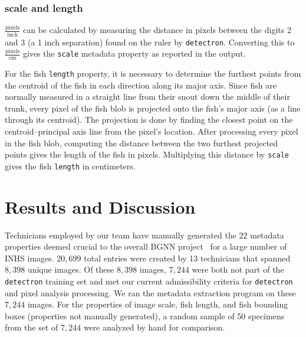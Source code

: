 \documentclass[conference]{IEEEtran}
\begin{document}
\subsubsection{scale and length}
\(\frac{\mathrm{pixels}}{\mathrm{inch}}\) can be calculated by measuring the distance in pixels between the digits 2 and 3 (a 1 inch separation) found on the ruler by \verb|detectron|. Converting this to \(\frac{\mathrm{pixels}}{\mathrm{cm}}\) gives the \verb|scale| metadata property as reported in the output.

For the fish \verb|length| property, it is necessary to determine the furthest points from the centroid of the fish in each direction along its major
axis. Since fish are normally measured in a straight line from their snout down the middle of their trunk, every pixel of the fish blob is projected
onto the fish's major axis (as a line through its centroid).
The projection is done by finding the closest point on the
centroid--principal axis line from the pixel's location.
After processing every pixel in the fish blob, computing the distance
between the two furthest projected points gives the length of the fish in pixels. Multiplying this distance by \verb|scale| gives the fish \verb|length| in centimeters.

\section{Results and Discussion}
Technicians employed by our team have manually generated the 22 metadata properties deemed crucial to the overall BGNN project~\cite{leipzig2021biodiversity} for a large number of INHS images. \(20,699\) total entries were created by 13 technicians that spanned \(8,398\) unique images. Of these \(8,398\) images, \(7,244\) were both not part of the \verb|detectron| training set and met our current admissibility criteria for \verb|detectron| and pixel analysis processing. We ran the metadata extraction program on these \(7,244\) images.
For the properties of image scale, fish length, and fish bounding boxes
(properties not manually generated),
a random sample of 50 specimens from the set of \(7,244\) were analyzed by
hand for comparison.
\end{document}
